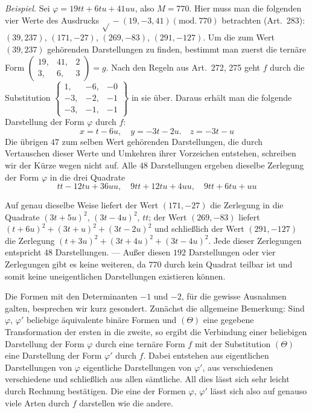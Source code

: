 \textit{Beispiel.} Sei $\varphi=19tt+6tu+41uu$, also $M=770$. Hier muss man die folgenden
vier Werte des Ausdrucks $\surd{}-(19,\allowbreak -3,\allowbreak 41)(\mathrm{mod.}\ 770)$ betrachten (Art.\ 283): $(39,237)$,
$(171,-27)$, $(269,-83)$, $(291,-127)$. Um die zum Wert $(39,237)$ gehörenden Darstellungen
zu finden, bestimmt man zuerst die ternäre Form $\left(\begin{smallmatrix}19,&41,&2\\3,&6,&3\end{smallmatrix}\right)=g$. Nach den
Regeln aus Art.\ 272, 275 geht $f$ durch die Substitution $\left\{\begin{smallmatrix}1,&-6,&-0\\-3,&-2,&-1\\-3,&-1,&-1\end{smallmatrix}\right\}$
in sie über. Daraus erhält man die folgende Darstellung der Form
$\varphi$ durch $f$:
\[
x=t-6u,\quad y=-3t-2u.\quad z=-3t-u
\]
Die übrigen $47$ zum selben Wert gehörenden Darstellungen, die
durch Vertauschen dieser Werte und Umkehren ihrer Vorzeichen entstehen,
schreiben wir der Kürze wegen nicht auf. Alle $48$ Darstellungen
ergeben dieselbe Zerlegung der Form $\varphi$ in die drei Quadrate
\[
tt-12tu+36uu,\quad 9tt+12tu+4uu,\quad 9tt+6tu+uu
\]

Auf genau dieselbe Weise liefert der Wert $(171,-27)$ die Zerlegung in
die Quadrate $(3t+5u)^2$, $(3t-4u)^2$, $tt$; der Wert $(269,-83)$ liefert $(t+6u)^2+(3t+u)^2+(3t-2u)^2$
und schließlich der Wert $(291,-127)$ die Zerlegung $(t+3u)^2+(3t+4u)^2+(3t-4u)^2$. Jede dieser
Zerlegungen entspricht $48$ Darstellungen. --- Außer diesen $192$
Darstellungen oder vier Zerlegungen gibt es keine weiteren, da $770$
durch kein Quadrat teilbar ist und somit keine uneigentlichen Darstellungen
existieren können.

Die Formen mit den Determinanten $-1$ und $-2$, für die gewisse
Ausnahmen galten, besprechen wir kurz gesondert. Zunächst die allgemeine
Bemerkung: Sind $\varphi$, $\varphi'$ beliebige äquivalente binäre Formen
und $(\Theta)$ eine gegebene Transformation der ersten in die zweite,
so ergibt die Verbindung einer beliebigen Darstellung der Form
$\varphi$ durch eine ternäre Form $f$ mit der Substitution $(\Theta)$
eine Darstellung der Form $\varphi'$ durch $f$. Dabei entstehen aus
eigentlichen Darstellungen von $\varphi$ eigentliche Darstellungen
von $\varphi'$, aus verschiedenen verschiedene und schließlich aus
allen sämtliche. All dies lässt sich sehr leicht durch Rechnung
bestätigen. Die eine der Formen $\varphi$, $\varphi'$ lässt sich also auf
genauso viele Arten durch $f$ darstellen wie die andere.

